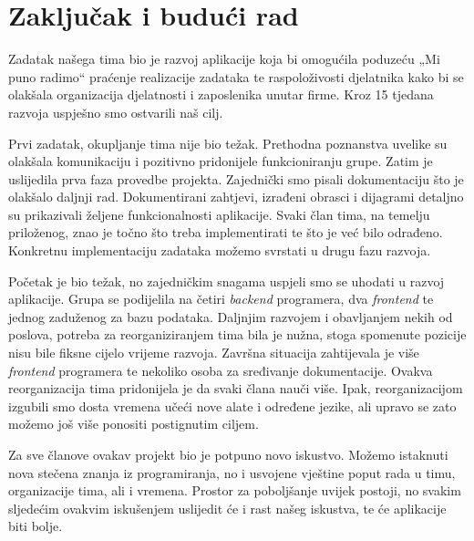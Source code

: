 \chapter{Zaključak i budući rad}
		
		
		

        Zadatak našega tima bio je razvoj aplikacije koja bi omogućila poduzeću „Mi puno radimo“ praćenje realizacije zadataka te raspoloživosti djelatnika kako bi se olakšala organizacija djelatnosti i zaposlenika unutar firme. Kroz 15 tjedana razvoja uspješno smo ostvarili naš cilj.  

Prvi zadatak, okupljanje tima nije bio težak. Prethodna poznanstva uvelike su olakšala komunikaciju i pozitivno pridonijele funkcioniranju grupe. Zatim je uslijedila prva faza provedbe projekta. Zajednički smo pisali dokumentaciju što je olakšalo daljnji rad. Dokumentirani zahtjevi, izrađeni obrasci i dijagrami detaljno su prikazivali željene funkcionalnosti aplikacije. Svaki član tima, na temelju priloženog, znao je točno što treba implementirati te što je već bilo odrađeno. Konkretnu implementaciju zadataka možemo svrstati u drugu fazu razvoja. 

Početak je bio težak, no zajedničkim snagama uspjeli smo se uhodati u razvoj aplikacije. Grupa se podijelila na četiri \textit{backend} programera, dva \textit{frontend} te jednog zaduženog za bazu podataka. Daljnjim razvojem i obavljanjem nekih od poslova, potreba za reorganiziranjem tima bila je nužna, stoga spomenute pozicije nisu bile fiksne cijelo vrijeme razvoja. Završna situacija zahtijevala je više \textit{frontend} programera te nekoliko osoba za sređivanje dokumentacije. Ovakva reorganizacija tima pridonijela je da svaki člana nauči više. Ipak, reorganizacijom izgubili smo dosta vremena učeći nove alate i određene jezike, ali upravo se zato možemo još više ponositi postignutim ciljem. 

Za sve članove ovakav projekt bio je potpuno novo iskustvo.  Možemo istaknuti nova stečena znanja iz programiranja, no i usvojene vještine poput rada u timu, organizacije tima, ali i vremena. Prostor za poboljšanje uvijek postoji, no svakim sljedećim ovakvim iskušenjem uslijedit će i rast našeg iskustva, te će aplikacije biti bolje. 
		
		\eject 